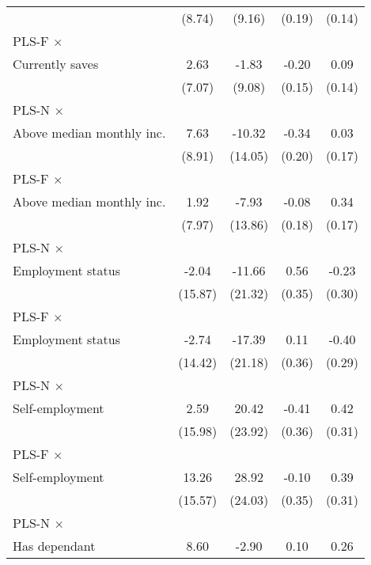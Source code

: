 \begin{table}[htbp]
\begin{tabular}{l*{4}{c}}
                &   (8.74)         &   (9.16)         &   (0.19)         &   (0.14)         \\
\addlinespace
PLS-F $\times$ \\ Currently saves&     2.63         &    -1.83         &    -0.20         &     0.09         \\
                &   (7.07)         &   (9.08)         &   (0.15)         &   (0.14)         \\
\addlinespace
PLS-N $\times$ \\ Above median monthly inc.&     7.63         &   -10.32         &    -0.34\sym{*}  &     0.03         \\
                &   (8.91)         &  (14.05)         &   (0.20)         &   (0.17)         \\
\addlinespace
PLS-F $\times$ \\ Above median monthly inc.&     1.92         &    -7.93         &    -0.08         &     0.34\sym{**} \\
                &   (7.97)         &  (13.86)         &   (0.18)         &   (0.17)         \\
\addlinespace
PLS-N $\times$ \\ Employment status&    -2.04         &   -11.66         &     0.56         &    -0.23         \\
                &  (15.87)         &  (21.32)         &   (0.35)         &   (0.30)         \\
\addlinespace
PLS-F $\times$ \\ Employment status&    -2.74         &   -17.39         &     0.11         &    -0.40         \\
                &  (14.42)         &  (21.18)         &   (0.36)         &   (0.29)         \\
\addlinespace
PLS-N $\times$ \\ Self-employment&     2.59         &    20.42         &    -0.41         &     0.42         \\
                &  (15.98)         &  (23.92)         &   (0.36)         &   (0.31)         \\
\addlinespace
PLS-F $\times$ \\ Self-employment&    13.26         &    28.92         &    -0.10         &     0.39         \\
                &  (15.57)         &  (24.03)         &   (0.35)         &   (0.31)         \\
\addlinespace
PLS-N $\times$ \\ Has dependant&     8.60         &    -2.90         &     0.10         &     0.26         \\

\end{tabular}
\end{table}
